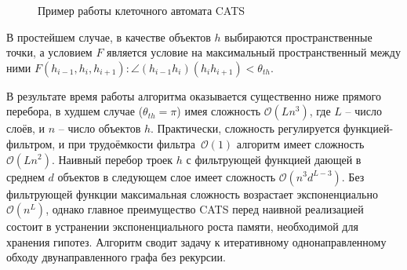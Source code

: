 \begin{figure}
    \caption{Пример работы клеточного автомата CATS~\cite{catsc-nim}}
    \label{fig:catsc-nim}
\end{figure}

В простейшем случае, в качестве объектов $h$ выбираются пространственные
точки, а условием $F$ является условие на максимальный пространственный
между ними $F(h_{i-1},h_{i},h_{i+1}): \angle(h_{i-1}h_i) (h_i h_{i+1}) < \theta_{th}$.

В результате время работы алгоритма оказывается существенно ниже
прямого перебора, в худшем случае ($\theta_{th} =\pi$) имея
сложность $\mathcal{O}(Ln^3)$, где $L$ -- число слоёв,
и $n$ -- число объектов $h$. Практически, сложность регулируется
функцией-фильтром, и при трудоёмкости фильтра~$\mathcal{O}(1)$ алгоритм
имеет сложность $\mathcal{O}(Ln^2)$. Наивный перебор троек $h$
с фильтрующей функцией дающей в среднем $d$ объектов в следующем слое
имеет сложность $\mathcal{O}(n^3 d^{L-3})$. Без фильтрующей функции
максимальная сложность возрастает экспоненциально $\mathcal{O}(n^L)$,
однако главное преимущество CATS перед наивной реализацией состоит
в устранении экспоненциального роста памяти, необходимой для хранения
гипотез. Алгоритм сводит задачу к итеративному однонаправленному обходу
двунаправленного графа без рекурсии.

